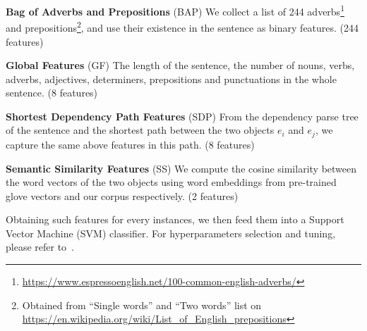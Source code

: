 \noindent
\textbf{Bag of Adverbs and Prepositions} (BAP)
We collect a list of 244 adverbs\footnote{\url{https://www.espressoenglish.net/100-common-english-adverbs/}} and prepositions\footnote{Obtained from ``Single words'' and ``Two words'' list on \url{https://en.wikipedia.org/wiki/List_of_English_prepositions}}, 
and use their existence in the sentence as binary features. (244 features)

\noindent
\textbf{Global Features} (GF)
The length of the sentence, the number of nouns, verbs, adverbs, adjectives, determiners, prepositions and punctuations in the whole sentence. (8 features)

\noindent
\textbf{Shortest Dependency Path Features} (SDP)
From the dependency parse
tree of the sentence and the shortest path between the two objects 
$e_i$ and $e_j$, we capture the same above features in this path. (8 features)

\noindent
\textbf{Semantic Similarity Features} (SS)
We compute the cosine similarity between the word vectors of the two objects using word embeddings from pre-trained glove vectors and our corpus respectively. (2 features)

Obtaining such features for every instances, 
we then feed them into a Support Vector Machine (SVM) classifier. 
For hyperparameters selection and tuning, please refer 
to~. 

